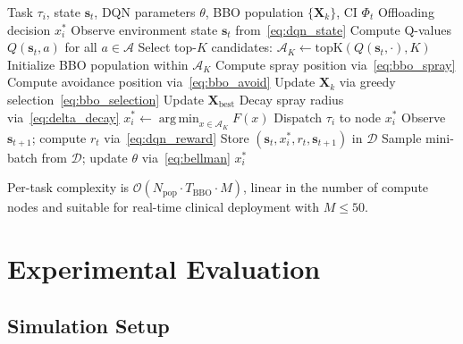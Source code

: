 \documentclass[journal]{IEEEtran}
\DeclareMathOperator*{\argmin}{arg\,min}
\newcommand{\vect}[1]{\mathbf{#1}}
\newcommand{\set}[1]{\mathcal{#1}}
\begin{document}
\begin{algorithm}[t]
  \caption{BBO-DRL Adaptive Task Scheduler}
  \label{alg:bbodrl}
  \begin{algorithmic}[1]
    \REQUIRE Task $\tau_i$, state $\vect{s}_t$, DQN parameters $\theta$,
             BBO population $\{\vect{X}_k\}$, CI $\Phi_t$
    \ENSURE Offloading decision $x_i^*$
    \STATE Observe environment state $\vect{s}_t$
           from~\eqref{eq:dqn_state}
    \STATE Compute Q-values $Q(\vect{s}_t, a)$ for all $a \in \set{A}$
    \STATE Select top-$K$ candidates:
           $\set{A}_K \leftarrow \mathrm{topK}(Q(\vect{s}_t,\cdot), K)$
    \STATE Initialize BBO population within $\set{A}_K$
        \STATE Compute spray position via~\eqref{eq:bbo_spray}
        \STATE Compute avoidance position via~\eqref{eq:bbo_avoid}
        \STATE Update $\vect{X}_k$ via greedy selection~\eqref{eq:bbo_selection}
      \ENDFOR
      \STATE Update $\vect{X}_{\mathrm{best}}$
      \STATE Decay spray radius via~\eqref{eq:delta_decay}
    \ENDFOR
    \STATE $x_i^* \leftarrow \argmin_{x \in \set{A}_K} F(x)$
    \STATE Dispatch $\tau_i$ to node $x_i^*$
    \STATE Observe $\vect{s}_{t+1}$; compute $r_t$ via~\eqref{eq:dqn_reward}
    \STATE Store $(\vect{s}_t, x_i^*, r_t, \vect{s}_{t+1})$ in $\set{D}$
    \STATE Sample mini-batch from $\set{D}$; update $\theta$
           via~\eqref{eq:bellman}
    \RETURN $x_i^*$
  \end{algorithmic}
\end{algorithm}

Per-task complexity is $\mathcal{O}(N_{\mathrm{pop}} \cdot T_{\mathrm{BBO}}
\cdot M)$, linear in the number of compute nodes and suitable for
real-time clinical deployment with $M \leq 50$.

\section{Experimental Evaluation}
\label{sec:eval}

\subsection{Simulation Setup}
\label{subsec:setup}
\end{document}

